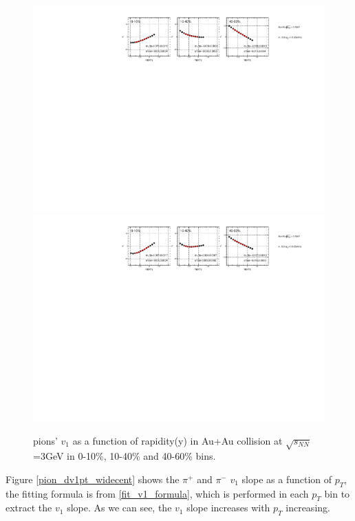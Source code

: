 \begin{figure}[h]
\includegraphics[scale=0.8]{FXT3gev/chapter3/fig/v1ypikp/pionp_v1y_wide_cent.pdf}
\includegraphics[scale=0.8]{FXT3gev/chapter3/fig/v1ypikp/pionm_v1y_wide_cent.pdf}
\caption{\label{pion_dv1y_widecent} pions' $v_{1}$ as a function of rapidity(y) in Au+Au collision at $\sqrt{s_{NN}}$=3GeV in 0-10\%, 10-40\% and 40-60\% bins.}
\end{figure}

\clearpage

Figure \ref{pion_dv1pt_widecent} shows the  $\pi^{+}$ and $\pi^{-}$ $v_{1}$ slope as a function of $p_{T}$, the fitting formula is from \ref{fit_v1_formula}, which is performed in each $p_{T}$ bin to extract the $v_{1}$ slope. As we can see, the $v_{1}$ slope increases with $p_{T}$ increasing.

